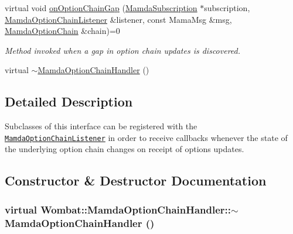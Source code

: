 \begin{CompactItemize}
virtual void \hyperlink{classWombat_1_1MamdaOptionChainHandler_336567cf64826492141bbd7eb010b840}{on\-Option\-Chain\-Gap} (\hyperlink{classWombat_1_1MamdaSubscription}{Mamda\-Subscription} $\ast$subscription, \hyperlink{classWombat_1_1MamdaOptionChainListener}{Mamda\-Option\-Chain\-Listener} \&listener, const Mama\-Msg \&msg, \hyperlink{classWombat_1_1MamdaOptionChain}{Mamda\-Option\-Chain} \&chain)=0
\begin{CompactList}\small\item\em Method invoked when a gap in option chain updates is discovered. \item\end{CompactList}\item 
virtual \hyperlink{classWombat_1_1MamdaOptionChainHandler_76462628f795ee91b1d422af4387f0fa}{$\sim$Mamda\-Option\-Chain\-Handler} ()
\end{CompactItemize}


\subsection{Detailed Description}
Subclasses of this interface can be registered with the {\tt \hyperlink{classWombat_1_1MamdaOptionChainListener}{Mamda\-Option\-Chain\-Listener}} in order to receive callbacks whenever the state of the underlying option chain changes on receipt of options updates. 



\subsection{Constructor \& Destructor Documentation}
\hypertarget{classWombat_1_1MamdaOptionChainHandler_76462628f795ee91b1d422af4387f0fa}{
\subsubsection[$\sim$MamdaOptionChainHandler]{\setlength{\rightskip}{0pt plus 5cm}virtual Wombat::Mamda\-Option\-Chain\-Handler::$\sim$Mamda\-Option\-Chain\-Handler ()}}
\label{classWombat_1_1MamdaOptionChainHandler_76462628f795ee91b1d422af4387f0fa}




